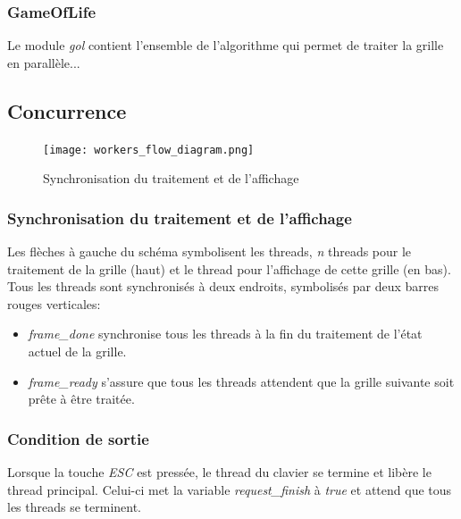 \documentclass[11pt, a4paper]{article}
\begin{document}
\subsubsection{GameOfLife}
Le module \textit{gol} contient l'ensemble de l'algorithme qui permet de traiter la grille en parallèle...

\newpage

\subsection{Concurrence}

\begin{figure}[H]
	\begin{center}
		\texttt{[image: workers\_flow\_diagram.png]}
	\end{center}
	\caption{Synchronisation du traitement et de l'affichage}
	\label{Synchronisation du traitement et de l'affichage}
\end{figure}

\subsubsection{Synchronisation du traitement et de l'affichage}

Les flèches à gauche du schéma symbolisent les threads, \textit{n} threads pour le traitement de la grille (haut) et le thread pour l'affichage de cette grille (en bas). \\

Tous les threads sont synchronisés à deux endroits, symbolisés par deux barres rouges verticales:
\begin{itemize}
	\item \textit{frame\_done} synchronise tous les threads à la fin du traitement de l'état actuel de la grille.
	\item \textit{frame\_ready} s'assure que tous les threads attendent que la grille suivante soit prête à être traitée.
\end{itemize}

\subsubsection{Condition de sortie}

Lorsque la touche \textit{ESC} est pressée, le thread du clavier se termine et libère le thread principal. Celui-ci met la variable \textit{request\_finish} à \textit{true} et attend que tous les threads se terminent. \\
\end{document}
